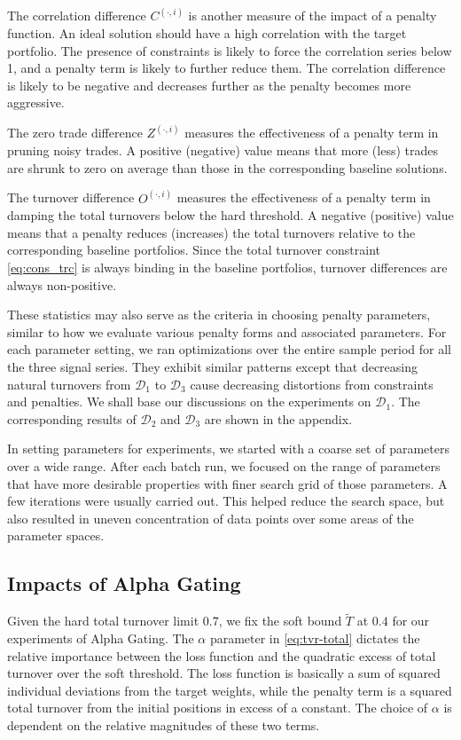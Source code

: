 \documentclass[11pt, letterpaper]{article}
\begin{document}
The correlation difference $C^{(\cdot,i)}$ is another measure of the impact of a penalty function. An ideal solution should have
a high correlation with the target portfolio. The presence of constraints is likely to force the correlation series below 1, and
a penalty term is likely to further reduce them. The correlation difference is likely to be negative and decreases further as
the penalty becomes more aggressive.

The zero trade difference $Z^{(\cdot,i)}$ measures the effectiveness of a penalty term in pruning noisy trades. A positive
(negative) value means that more (less) trades are shrunk to zero on average than those in the corresponding baseline
solutions.

The turnover difference $O^{(\cdot,i)}$ measures the effectiveness of a penalty term in damping the total turnovers below the
hard threshold. A negative (positive) value means that a penalty reduces (increases) the total turnovers relative to the
corresponding baseline portfolios. Since the total turnover constraint \eqref{eq:cons_trc} is always binding in the baseline
portfolios, turnover differences are always non-positive.

These statistics may also serve as the criteria in choosing penalty parameters, similar to how we evaluate various penalty forms
and associated parameters. For each parameter setting, we ran optimizations over the entire sample period for all the three
signal series. They exhibit similar patterns except that decreasing natural turnovers from $\mathcal{D}_1$ to $\mathcal{D}_3$
cause decreasing distortions from constraints and penalties. We shall base our discussions on the experiments on
$\mathcal{D}_1$. The corresponding results of $\mathcal{D}_2$ and $\mathcal{D}_3$ are shown in the appendix.

In setting parameters for experiments, we started with a coarse set of parameters over a wide range. After each batch run, we
focused on the range of parameters that have more desirable properties with finer search grid of those parameters. A few
iterations were usually carried out. This helped reduce the search space, but also resulted in uneven concentration of data
points over some areas of the parameter spaces.

\subsection{Impacts of Alpha Gating}
Given the hard total turnover limit $0.7$, we fix the soft bound $\tilde{T}$ at $0.4$ for our experiments of Alpha Gating. The
$\alpha$ parameter in \eqref{eq:tvr-total} dictates the relative importance between the loss function and the quadratic excess
of total turnover over the soft threshold. The loss function is basically a sum of squared individual deviations from the target
weights, while the penalty term is a squared total turnover from the initial positions in excess of a constant. The choice of
$\alpha$ is dependent on the relative magnitudes of these two terms.
\end{document}
